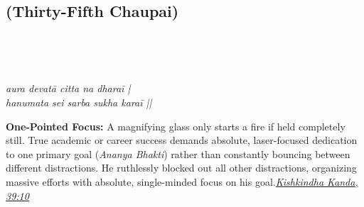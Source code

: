 
\newpage

\subsection*{ (Thirty-Fifth Chaupai)}

\begin{minipage}[t]{0.55\textwidth}
\vspace{0pt}

{\large \linespread{1.5}\selectfont
{}\\
\par}

\vspace{0.5em}

{\large \linespread{1.5}\selectfont
{}\\
\par}

\vspace{0.5em}

{\large \linespread{1.3}\selectfont
\textit{aura devatā citta na dharaī |}\\
\textit{hanumata sei sarba sukha karaī ||}
\par}
\end{minipage}%
\hfill
\begin{minipage}[t]{0.42\textwidth}
\vspace{0pt}
\begin{tcolorbox}[anchorbox]
\textbf{One-Pointed Focus:} A magnifying glass only starts a fire if held completely still. True academic or career success demands absolute, laser-focused dedication to one primary goal (\textit{Ananya Bhakti}) rather than constantly bouncing between different distractions.
\vspace{0.5em}\newline He ruthlessly blocked out all other distractions, organizing massive efforts with absolute, single-minded focus on his goal.\newline\null\hfill\href{https://www.valmiki.iitk.ac.in/sloka?field_kanda_tid=4&language=dv&field_sarga_value=39}{\textit{Kishkindha Kanda, 39:10}}
\end{tcolorbox}
\end{minipage}

